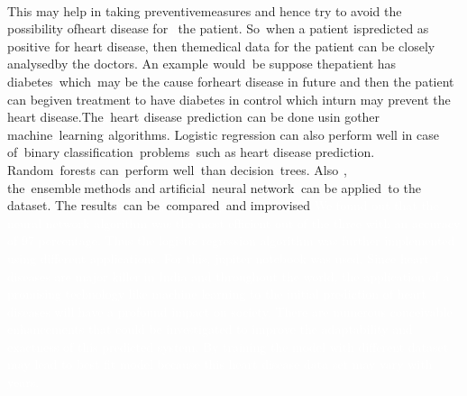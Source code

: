 \documentclass[oneside,12pt]{Classes/VTU}
\begin{document}
	\\
	This may help in taking preventivemeasures and hence try to avoid the possibility ofheart disease for\tiny\textcolor{white}{m}\normalsize the patient. So\tiny\textcolor{white}{o}\normalsize when a patient\tiny\textcolor{white}{s}\normalsize ispredicted  as  positive\tiny\textcolor{white}{s}\normalsize  for  heart  disease,  then  themedical data for the patient can be closely analysedby the doctors. An example\tiny\textcolor{white}{s}\normalsize would\tiny\textcolor{white}{y}\normalsize be suppose thepatient  has  diabetes\tiny\textcolor{white}{y}\normalsize  which\tiny\textcolor{white}{y}\normalsize may  be  the cause   forheart disease in future and  then the patient can begiven treatment to have diabetes in control which inturn may prevent the heart disease.The\tiny\textcolor{white}{y}\normalsize  heart\tiny\textcolor{white}{s}\normalsize  disease\tiny\textcolor{white}{s}\normalsize  prediction\tiny\textcolor{white}{s}\normalsize  can  be   done  usin gother   machine\tiny\textcolor{white}{y}\normalsize   learning\tiny\textcolor{white}{s}\normalsize   algorithms. Logistic regression can also perform well in case of\tiny\textcolor{white}{y}\normalsize binary classification\tiny\textcolor{white}{y}\normalsize   problems\tiny\textcolor{white}{y}\normalsize   such   as   heart   disease prediction. Random\tiny\textcolor{white}{y}\normalsize forests can\tiny\textcolor{white}{y}\normalsize  perform well\tiny\textcolor{white}{y}\normalsize than decision\tiny\textcolor{white}{y}\normalsize  trees.   Also\tiny\textcolor{white}{y}\normalsize, the\tiny\textcolor{white}{y}\normalsize  ensemble\tiny\textcolor{white}{i}\normalsize methods   and artificial\tiny\textcolor{white}{y}\normalsize neural network\tiny\textcolor{white}{y}\normalsize can be applied\tiny\textcolor{white}{y}\normalsize to the dataset. The results\tiny\textcolor{white}{y}\normalsize can be\tiny\textcolor{white}{y}\normalsize compared\tiny\textcolor{white}{y}\normalsize and improvised
	\tiny\textcolor{white}{We found out that the neural network algorithm was the most efficient out of the three with an accuracy of 97 percentage. Thus the logistic regression algorithm was further implemented using different applications. For this, jupiter notebook was used. Since heart diseases are major killer in India and throughout the world, the application of a promising technology like machine learning to the initial prediction of heart diseases will have a profound impact on society. There are numerous conceivable enhancements that could be investigated to improve the adaptability and exactness of this predicted system. By training the model with different dataset may lead to best fit model because this heart disease data set may vary with years.}\normalsize
	
\end{document}
